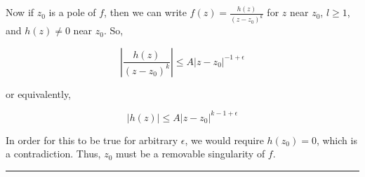 \documentclass{article}
\begin{document}
\vskip 0.5cm
Now if $z_0$ is a pole of $f$, then we can write $f(z) = \frac{h(z)}{(z-z_0)^k}$ for $z$ near $z_0$, $l \geq 1$, and $h(z) \neq 0$ near $z_0$. So, 

\[ \left|\frac{h(z)}{(z-z_0)^k}\right| \leq A\left|z-z_0\right|^{-1+\epsilon} \]

or equivalently,

\[ \left|h(z)\right| \leq A\left|z-z_0\right|^{k-1+\epsilon} \]

In order for this to be true for arbitrary $\epsilon$, we would require $h(z_0) = 0$, which is a contradiction. Thus, $z_0$ must be a removable singularity of $f$.

\vskip 0.5cm
\hrule 
\vskip 0.5cm







\end{document}

